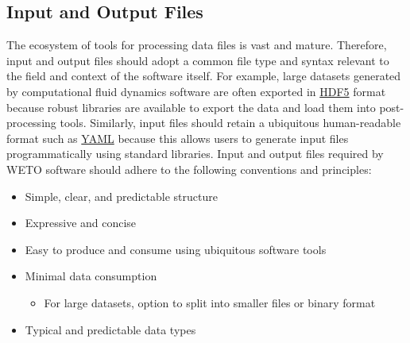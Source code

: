 \documentclass[]{nlr}
\begin{document}
\subsection{Input and Output Files}
The ecosystem of tools for processing data files is vast and mature.
Therefore, input and output files should adopt a common file type and syntax relevant to the
field and context of the software itself.
For example, large datasets generated by computational fluid dynamics software are often
exported in \href{https://www.hdfgroup.org/solutions/hdf5/}{HDF5} format because robust
libraries are available to export the data and load them into post-processing tools.
Similarly, input files should retain a ubiquitous human-readable format such as
\href{https://yaml.org}{YAML} because this allows users to generate input files programmatically
using standard libraries. Input and output files required by WETO software should
adhere to the following conventions and principles:

\begin{itemize}
\item Simple, clear, and predictable structure
\item Expressive and concise
\item Easy to produce and consume using ubiquitous software tools

\item Minimal data consumption
\begin{itemize}
    \item For large datasets, option to split into smaller files or binary format
\end{itemize}

\item Typical and predictable data types

\end{itemize}
\end{document}
